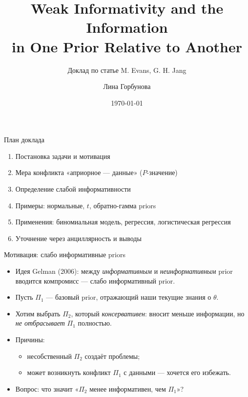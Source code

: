 \documentclass[aspectratio=169,10pt]{beamer}
\title[Слабо информативные априорные распределения]{Weak Informativity and the Information\\ in One Prior Relative to Another}
\subtitle{Доклад по статье M. Evans, G. H. Jang}
\author{Лина Горбунова}
\institute{МФТИ}
\date{\today}
\begin{document}
\begin{frame}
  \titlepage
\end{frame}

\begin{frame}{План доклада}
  \begin{enumerate}
    \item Постановка задачи и мотивация
    \item Мера конфликта «априорное — данные» ($P$-значение)
    \item Определение слабой информативности
    \item Примеры: нормальные, $t$, обратно-гамма priors
    \item Применения: биномиальная модель, регрессия, логистическая регрессия
    \item Уточнение через анциллярность и выводы
  \end{enumerate}
\end{frame}

\begin{frame}{Мотивация: слабо информативные priors}
  \begin{itemize}
    \item Идея Gelman (2006): между \emph{информативным} и \emph{неинформативным} prior
          вводится компромисс — \alert{слабо информативный} prior.
    \item Пусть $\Pi_1$ — базовый prior, отражающий наши текущие знания о $\theta$.
    \item Хотим выбрать $\Pi_2$, который \emph{консервативен}: вносит меньше информации,
          но \emph{не отбрасывает} $\Pi_1$ полностью.
    \item Причины:
      \begin{itemize}
        \item несобственный $\Pi_2$ создаёт проблемы;
        \item может возникнуть конфликт $\Pi_1$ с данными — хочется его избежать.
      \end{itemize}
    \item \alert{Вопрос:} что значит «$\Pi_2$ менее информативен, чем $\Pi_1$»?
  \end{itemize}
\end{frame}
\end{document}
